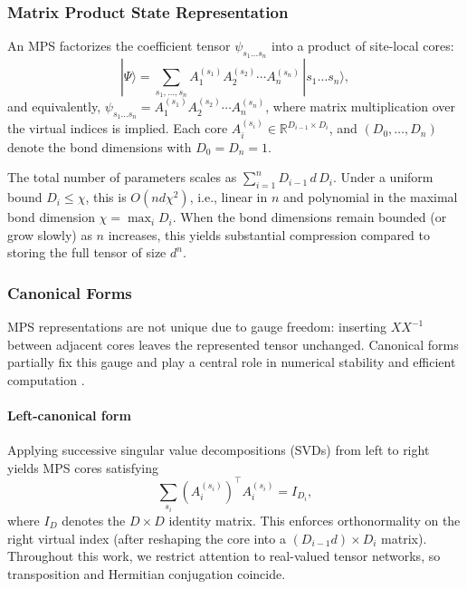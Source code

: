 \documentclass[letterpaper, 10 pt, conference]{ieeeconf}  %
\begin{document}
\subsubsection{Matrix Product State Representation}

An MPS factorizes the coefficient tensor $\psi_{s_1 \dots s_n}$ into a product
of site-local cores:
\begin{equation}
|\Psi\rangle
= \sum_{s_1,\dots,s_n}
A_1^{(s_1)} A_2^{(s_2)} \cdots A_n^{(s_n)}
\, |s_1 \dots s_n\rangle,
\end{equation}
and equivalently,
$\psi_{s_1 \dots s_n} = A_1^{(s_1)} A_2^{(s_2)} \cdots A_n^{(s_n)}$,
where matrix multiplication over the virtual indices is implied. Each core
$A_i^{(s_i)} \in \mathbb{R}^{D_{i-1} \times D_i}$, and
$(D_0,\dots,D_n)$ denote the bond dimensions with $D_0 = D_n = 1$.

The total number of parameters scales as
$\sum_{i=1}^{n} D_{i-1}\, d\, D_i$.
Under a uniform bound $D_i \le \chi$, this is $O(n d \chi^2)$, i.e., linear in
$n$ and polynomial in the maximal bond dimension $\chi = \max_i D_i$. When the
bond dimensions remain bounded (or grow slowly) as $n$ increases, this yields
substantial compression compared to storing the full tensor of size $d^n$.

\subsubsection{Canonical Forms}

MPS representations are not unique due to gauge freedom: inserting
$X X^{-1}$ between adjacent cores leaves the represented tensor unchanged.
Canonical forms partially fix this gauge and play a central role in numerical
stability and efficient computation \cite{Schollwock2011}.

\paragraph{Left-canonical form}
Applying successive singular value decompositions (SVDs) from left to right
yields MPS cores satisfying
\begin{equation}
\sum_{s_i}
\left(A_i^{(s_i)}\right)^\top A_i^{(s_i)} = I_{D_i},
\end{equation}
where $I_D$ denotes the $D \times D$ identity matrix.
This enforces orthonormality on the right virtual index (after reshaping the
core into a $(D_{i-1} d)\times D_i$ matrix). Throughout this work, we restrict
attention to real-valued tensor networks, so transposition and Hermitian
conjugation coincide.
\end{document}

